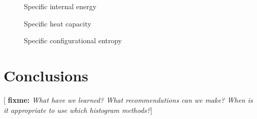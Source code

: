 \documentclass[11pt]{article}
\newcommand{\red}[1]{{\bf \color{red} #1}}
\newcommand{\fixme}[1]{[\red{fixme:} \emph{#1}]}
\begin{document}
\begin{figure}[H]
  \centering
  \caption[Internal energy]{Specific internal energy}
  \label{fig:u_error}
\end{figure}

\begin{figure}[H]
  \centering
  \caption[Heat capacity]{Specific heat capacity}
  \label{fig:cv_error}
\end{figure}

\begin{figure}[H]
  \centering
  \caption[Configurational entropy]{Specific configurational
    entropy}
  \label{fig:s_error}
\end{figure}


\section{Conclusions}
\label{sec:conclusions}

\fixme{What have we learned? What recommendations can we make? When is
  it appropriate to use which histogram methods?}


\nocite{*} 
\end{document}
